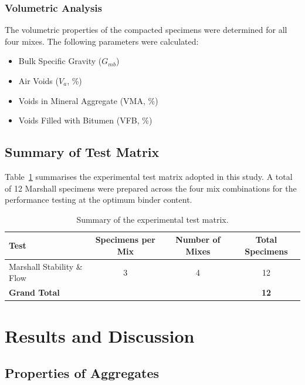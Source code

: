 \documentclass[12pt,a4paper]{article}
\begin{document}
\subsubsection{Volumetric Analysis}

The volumetric properties of the compacted specimens were determined for all four mixes. The following parameters were calculated:

\begin{itemize}
    \item Bulk Specific Gravity ($G_{mb}$)
    \item Air Voids ($V_a$, \%)
    \item Voids in Mineral Aggregate (VMA, \%)
    \item Voids Filled with Bitumen (VFB, \%)
\end{itemize}

\subsection{Summary of Test Matrix}

Table~\ref{tab:test_matrix} summarises the experimental test matrix adopted in this study. A total of 12 Marshall specimens were prepared across the four mix combinations for the performance testing at the optimum binder content.

\begin{table}[htbp]
    \centering
    \caption{Summary of the experimental test matrix.}
    \label{tab:test_matrix}
    \begin{tabular}{@{}lccc@{}}
        \toprule
        \textbf{Test} & \textbf{Specimens per Mix} & \textbf{Number of Mixes} & \textbf{Total Specimens} \\
        \midrule
        Marshall Stability \& Flow & 3 & 4 & 12 \\
        \midrule
        \textbf{Grand Total} & & & \textbf{12} \\
        \bottomrule
    \end{tabular}
\end{table}


\section{Results and Discussion}

\subsection{Properties of Aggregates}
\end{document}
